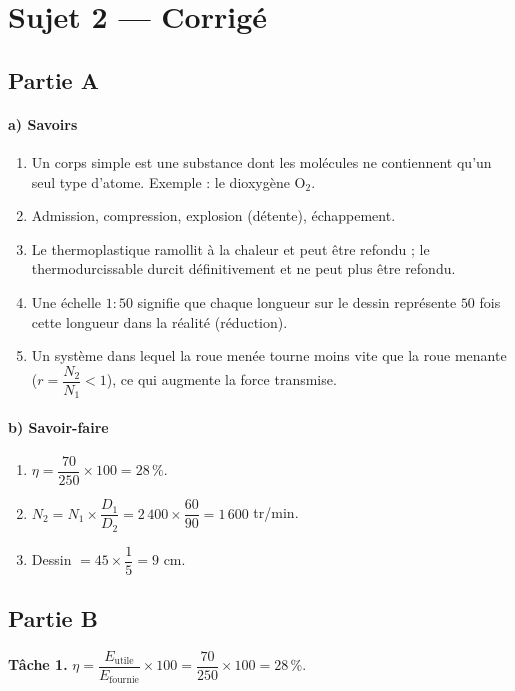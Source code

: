 \section{Sujet 2 — Corrigé}

\subsection*{Partie A}

\paragraph{a) Savoirs}
\begin{enumerate}[label=\arabic*)]
\item Un corps simple est une substance dont les molécules ne contiennent qu'un seul type
d'atome. Exemple : le dioxygène $\mathrm{O_2}$.
\item Admission, compression, explosion (détente), échappement.
\item Le thermoplastique ramollit à la chaleur et peut être refondu ; le thermodurcissable
durcit définitivement et ne peut plus être refondu.
\item Une échelle $1{:}50$ signifie que chaque longueur sur le dessin représente $50$ fois
cette longueur dans la réalité (réduction).
\item Un système dans lequel la roue menée tourne moins vite que la roue menante
($r=\dfrac{N_2}{N_1}<1$), ce qui augmente la force transmise.
\end{enumerate}

\paragraph{b) Savoir-faire}
\begin{enumerate}[label=\arabic*)]
\item $\eta=\dfrac{70}{250}\times100=28\,\%$.
\item $N_2=N_1\times\dfrac{D_1}{D_2}=2\,400\times\dfrac{60}{90}=1\,600$ tr/min.
\item Dessin $=45\times\dfrac15=9$ cm.
\end{enumerate}

\subsection*{Partie B}

\textbf{Tâche 1.} $\eta=\dfrac{E_{\text{utile}}}{E_{\text{fournie}}}\times100=
\dfrac{70}{250}\times100=28\,\%$.

